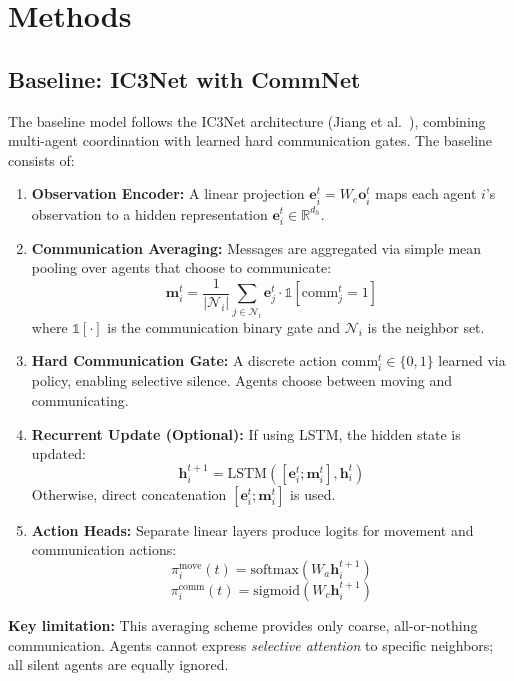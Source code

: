 \section{Methods}
\label{sec:methods}

\subsection{Baseline: IC3Net with CommNet}
\label{subsec:baseline}

The baseline model follows the IC3Net architecture (Jiang et al.~\cite{ic3net}), combining multi-agent coordination with learned hard communication gates. The baseline consists of:

\begin{enumerate}
    \item \textbf{Observation Encoder:} A linear projection $\mathbf{e}_i^t = W_e \mathbf{o}_i^t$ maps each agent $i$'s observation to a hidden representation $\mathbf{e}_i^t \in \mathbb{R}^{d_h}$.
    
    \item \textbf{Communication Averaging:} Messages are aggregated via simple mean pooling over agents that choose to communicate:
    \[
    \mathbf{m}^t_i = \frac{1}{|\mathcal{N}_i|} \sum_{j \in \mathcal{N}_i} \mathbf{e}_j^t \cdot \mathbb{1}[\text{comm}_j^t = 1]
    \]
    where $\mathbb{1}[\cdot]$ is the communication binary gate and $\mathcal{N}_i$ is the neighbor set.
    
    \item \textbf{Hard Communication Gate:} A discrete action $\text{comm}_i^t \in \{0, 1\}$ learned via policy, enabling selective silence. Agents choose between moving and communicating.
    
    \item \textbf{Recurrent Update (Optional):} If using LSTM, the hidden state is updated:
    \[
    \mathbf{h}_i^{t+1} = \text{LSTM}([\mathbf{e}_i^t; \mathbf{m}^t_i], \mathbf{h}_i^t)
    \]
    Otherwise, direct concatenation $[\mathbf{e}_i^t; \mathbf{m}^t_i]$ is used.
    
    \item \textbf{Action Heads:} Separate linear layers produce logits for movement and communication actions:
    \[
    \pi_i^{\text{move}}(t) = \text{softmax}(W_a \mathbf{h}_i^{t+1})
    \]
    \[
    \pi_i^{\text{comm}}(t) = \text{sigmoid}(W_c \mathbf{h}_i^{t+1})
    \]
\end{enumerate}

\textbf{Key limitation:} This averaging scheme provides only coarse, all-or-nothing communication. Agents cannot express \emph{selective attention} to specific neighbors; all silent agents are equally ignored.


